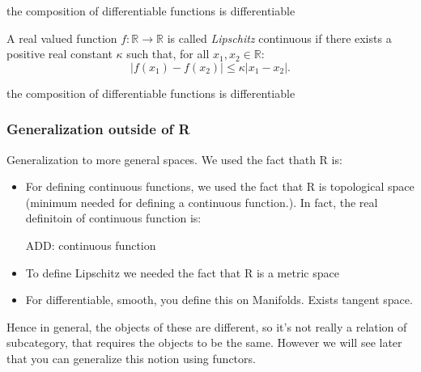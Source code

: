 \begin{example}
the composition of differentiable functions is differentiable
\end{example}



\begin{definition}
A real valued function $f\colon \mathbb{R}\to \mathbb{R}$ is called \emph{Lipschitz} continuous if there exists a positive real constant $\kappa$ such that, for all $x_1,x_2\in \mathbb{R}$:
\begin{equation}
    \vert f(x_1)-f(x_2)\vert \leq \kappa \vert x_1-x_2\vert.
\end{equation}
\end{definition}

\begin{example}
the composition of differentiable functions is differentiable
\end{example}



\subsubsection{Generalization outside of R}
Generalization to more general spaces. 
We used the fact thath R is:
\begin{itemize}
\item For defining continuous functions, we used the fact that R is topological space (minimum needed for defining a continuous function.). In fact, the real definitoin of continuous function is: 

ADD: continuous function

\item To define Lipschitz we needed the fact that R is a metric space 
\item For differentiable, smooth, you define this on Manifolds. Exists tangent space. 
\end{itemize}
     
Hence in general, the objects of these are different, so it's not really a relation of subcategory, that requires
the objects to be the same. However we will see later that you can generalize this notion using functors. 


